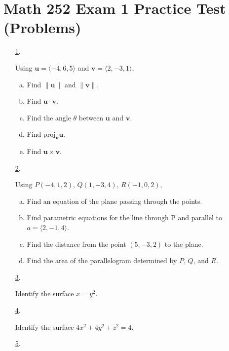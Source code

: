 \documentclass[fleqn]{article}
\renewcommand{\vec}[1]{\mathbf{#1}}
\begin{document}
\section*{Math 252 Exam 1 Practice Test (Problems)}
\begin{itemize}

\item[\hyperlink{1-answer}{1}.]\hypertarget{1-problem}{}

Using \(\vec u=\langle-4,6,5\rangle\) and \(\vec v=\langle 2,-3,1\rangle\),
\begin{enumerate}[a.]
  \item Find \(\|\vec u\|\) and \(\|\vec v\|\).
  \item Find \(\vec u\cdot\vec v\).
  \item Find the angle \(\theta\) between \(\vec u\) and \(\vec v\).
  \item Find \(\text{proj}_{\vec v}\vec u\).
  \item Find \(\vec u\times\vec v\).
\end{enumerate}
\smallskip

\item[\hyperlink{2-answer}{2}.]\hypertarget{2-problem}{}

Using \(P(-4,1,2)\), \(Q(1,-3,4)\), \(R(-1,0,2)\),
\begin{enumerate}[a.]
  \item Find an equation of the plane passing through the points.
  \item Find parametric equations for the line through P and parallel to \(a=\langle 2,-1,4\rangle\).
  \item Find the distance from the point \((5,-3,2)\) to the plane.
  \item Find the area of the parallelogram determined by \(P\), \(Q\), and \(R\).
\end{enumerate}
\smallskip

\item[\hyperlink{3-answer}{3}.]\hypertarget{3-problem}{}

Identify the surface \(x=y^2\).
\smallskip

\item[\hyperlink{4-answer}{4}.]\hypertarget{4-problem}{}

Identify the surface \(4x^2+4y^2+z^2=4\).
\smallskip

\item[\hyperlink{5-answer}{5}.]\hypertarget{5-problem}{}


\end{itemize}
\end{document}
